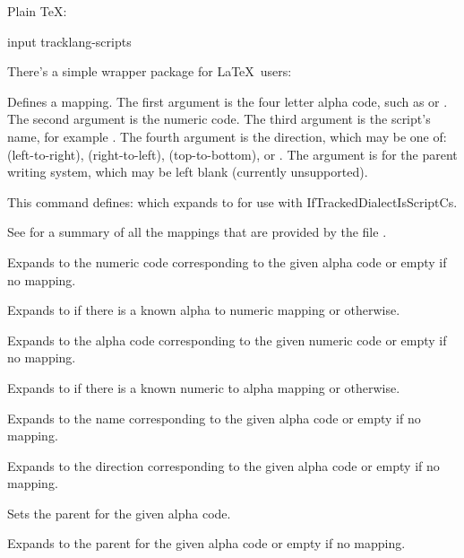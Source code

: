 \documentclass[titlepage=false,oneside,
 fontsize=12pt,captions=tableheading]{scrbook}
\begin{document}
Plain \TeX:
\begin{codebox}
\gls{input} tracklang-scripts
\end{codebox}
There's a simple wrapper package  for
\LaTeX\ users:
\begin{codebox}
\end{codebox}

Defines a mapping. The first argument is the four letter alpha code,
such as  or . The second argument is the numeric
code. The third argument is the script's name, for example
. The fourth argument is the direction, which
may be one of:  (left-to-right),  (right-to-left),
 (top-to-bottom),  or .
The  argument is for the parent writing system, which
may be left blank (currently unsupported).

This command defines:
which expands to  for use with \gls{IfTrackedDialectIsScriptCs}.

See  for a summary of all the mappings 
that are provided by the file .

Expands to the numeric code corresponding to the given alpha code or
empty if no mapping.

Expands to  if there is a known alpha to numeric mapping
or  otherwise.

Expands to the alpha code corresponding to the given numeric code or
empty if no mapping.

Expands to  if there is a known numeric to alpha mapping
or  otherwise.

Expands to the name corresponding to the given alpha code or
empty if no mapping.

Expands to the direction corresponding to the given alpha code or
empty if no mapping.

Sets the parent for the given alpha code.

Expands to the parent for the given alpha code or empty if no
mapping.
\end{document}
